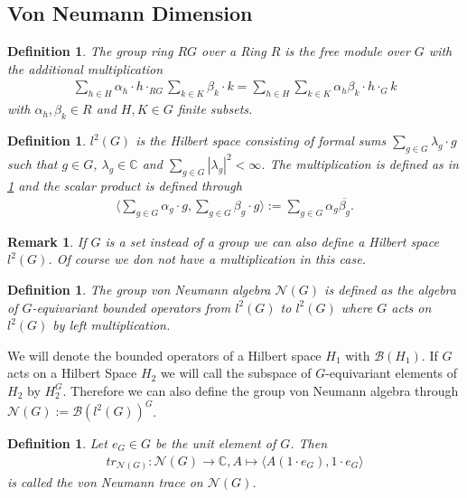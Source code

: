\documentclass[12pt,a4paper]{scrartcl}
\newtheorem{Definition}[Theorem]{Definition}
\newtheorem{Remark}[Theorem]{Remark}
\numberwithin{equation}{section}
\newcommand{\C}{\mathbb{C}} %
\newcommand{\2}{\mathbb{Z} / 2 \mathbb{Z}}
\newcommand{\1}{\bar{1}}
\newcommand{\0}{\bar{0}}
\begin{document}
\subsection{Von Neumann Dimension}

\begin{Definition} \label{GR}
	The group ring $RG$ over a Ring $R$ is the free module over $G$ with the additional multiplication
	\begin{align*}
		\sum_{h \in H} \alpha_h \cdot h \cdot_{RG} \sum_{k \in K} \beta_k \cdot k = \sum_{h \in H} \sum_{k \in K} \alpha_h \beta_k \cdot h \cdot_G k
	\end{align*}
	with $\alpha_h, \beta_k \in R$ and $H, K \in G$ finite subsets.
\end{Definition}
\begin{Definition}
	$l^2(G)$ is the Hilbert space consisting of formal sums $\sum_{g \in G} \lambda_g \cdot g$ such that $g \in G$, $\lambda_g \in \C$ and $\sum_{g \in G} |\lambda_g|^2 < \infty$. The multiplication is defined as in \ref{GR} and the scalar product is defined through
	\begin{align*}
		\langle \sum_{g \in G} \alpha_g \cdot g, \sum_{g \in G} \beta_g \cdot g \rangle := \sum_{g \in G} \alpha_g \overline{\beta_g}.
	\end{align*}
\end{Definition}
\begin{Remark}
	If $G$ is a set instead of a group we can also define a Hilbert space $l^2(G)$. Of course we don not have a multiplication in this case.
\end{Remark}
\begin{Definition}
	The group von Neumann algebra $\mathcal{N}(G)$ is defined as the algebra of $G$-equivariant bounded operators from $l^2(G)$ to $l^2(G)$ where $G$ acts on $l^2(G)$ by left multiplication.
\end{Definition}
We will denote the bounded operators of a Hilbert space $H_1$ with $\mathcal{B}(H_1)$. If $G$ acts on a Hilbert Space $H_2$ we will call the subspace of $G$-equivariant elements of $H_2$ by $H_2^G$. Therefore we can also define the group von Neumann algebra through $\mathcal{N}(G) := \mathcal{B}(l^2(G))^G$.
\begin{Definition}
	Let $e_G \in G$ be the unit element of $G$. Then
	\begin{align*}
		tr_{\mathcal{N}(G)}: \mathcal{N}(G) \to \C, A  \mapsto \langle A(1 \cdot e_G), 1 \cdot e_G \rangle
	\end{align*}
	is called the von Neumann trace on $\mathcal{N}(G)$.
\end{Definition}
\end{document}
